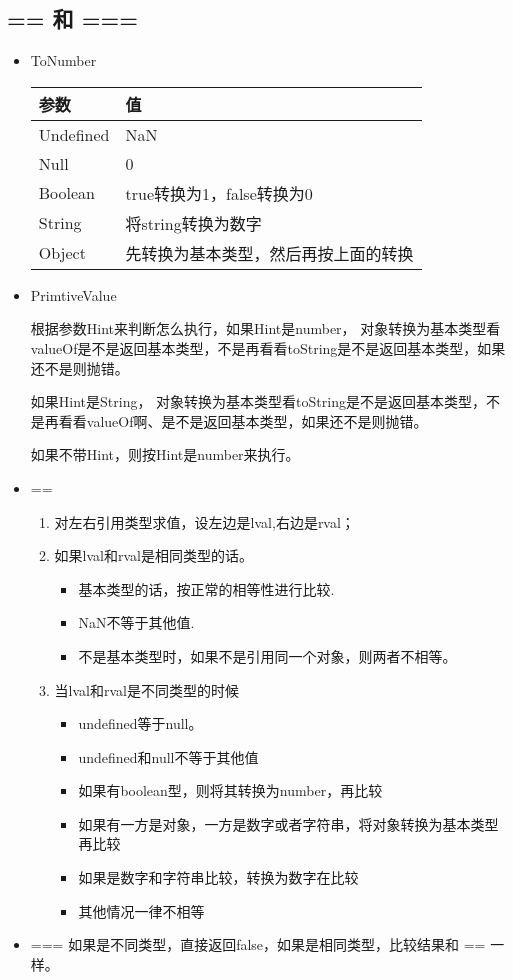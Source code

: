 \subsection{== 和 ===}

\begin{itemize}
\item ToNumber

\begin{tabular}{|l|l|}
\hline
参数 & 值 \\
\hline
Undefined & NaN \\
\hline
Null & 0 \\
\hline
Boolean & true转换为1，false转换为0 \\
\hline
String & 将string转换为数字 \\
\hline
Object & 先转换为基本类型，然后再按上面的转换 \\
\hline
\end{tabular}

\item PrimtiveValue

根据参数Hint来判断怎么执行，如果Hint是number，
对象转换为基本类型看valueOf是不是返回基本类型，不是再看看toString是不是返回基本类型，如果还不是则抛错。

如果Hint是String，
对象转换为基本类型看toString是不是返回基本类型，不是再看看valueOf啊、是不是返回基本类型，如果还不是则抛错。

如果不带Hint，则按Hint是number来执行。
\end{itemize}

\begin{itemize}
\item == 

\begin{enumerate}
\item 对左右引用类型求值，设左边是lval,右边是rval；
\item 如果lval和rval是相同类型的话。
	\begin{itemize}
	\item 基本类型的话，按正常的相等性进行比较.
	\item NaN不等于其他值.
	\item 不是基本类型时，如果不是引用同一个对象，则两者不相等。
	\end{itemize}
\item 当lval和rval是不同类型的时候
	\begin{itemize}
	\item undefined等于null。
	\item undefined和null不等于其他值
	\item 如果有boolean型，则将其转换为number，再比较
	\item 如果有一方是对象，一方是数字或者字符串，将对象转换为基本类型再比较
	\item 如果是数字和字符串比较，转换为数字在比较
	\item 其他情况一律不相等
	\end{itemize}
\end{enumerate}

\item ===
如果是不同类型，直接返回false，如果是相同类型，比较结果和 == 一样。
\end{itemize}

